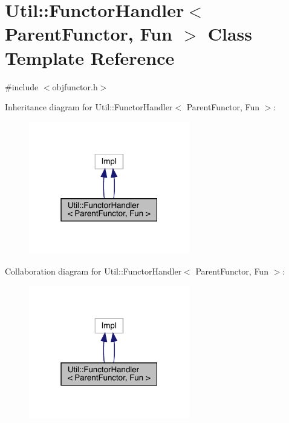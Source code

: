 \hypertarget{classUtil_1_1FunctorHandler}{}\section{Util\+:\+:Functor\+Handler$<$ Parent\+Functor, Fun $>$ Class Template Reference}
\label{classUtil_1_1FunctorHandler}


{\ttfamily \#include $<$objfunctor.\+h$>$}



Inheritance diagram for Util\+:\+:Functor\+Handler$<$ Parent\+Functor, Fun $>$\+:\nopagebreak
\begin{figure}[H]
\begin{center}
\leavevmode
\includegraphics[width=199pt]{d8/db9/classUtil_1_1FunctorHandler__inherit__graph}
\end{center}
\end{figure}


Collaboration diagram for Util\+:\+:Functor\+Handler$<$ Parent\+Functor, Fun $>$\+:\nopagebreak
\begin{figure}[H]
\begin{center}
\leavevmode
\includegraphics[width=199pt]{df/df4/classUtil_1_1FunctorHandler__coll__graph}
\end{center}
\end{figure}

